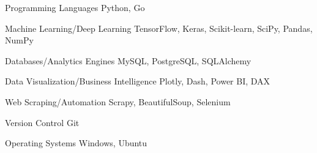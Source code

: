 
\begin{cvskills}
	
	\cvskill
	{Programming Languages} %
	{Python, Go} %
	
	\cvskill
	{Machine Learning/Deep Learning} %
	{TensorFlow, Keras, Scikit-learn, SciPy, Pandas, NumPy} %
	
	\cvskill
	{Databases/Analytics Engines} %
	{MySQL, PostgreSQL, SQLAlchemy} %
	
	\cvskill
	{Data Visualization/Business Intelligence} %
	{Plotly, Dash, Power BI, DAX} %
	
	\cvskill
	{Web Scraping/Automation} %
	{Scrapy, BeautifulSoup, Selenium} %
	
	\cvskill
	{Version Control} %
	{Git} %
	
	\cvskill
	{Operating Systems} %
	{Windows, Ubuntu} %
	
\end{cvskills}
